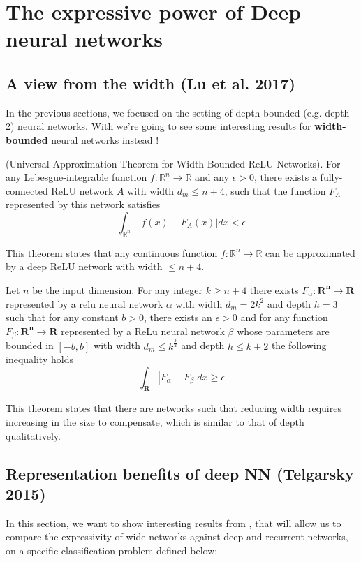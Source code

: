 \documentclass{article}
\begin{document}
\section{The expressive power of Deep neural networks}

\subsection{A view from the width (Lu et al. 2017)}
In the previous sections, we focused on the setting of depth-bounded (e.g. depth-2) neural networks. With \cite{lu2017expressive} we're going to see some interesting results for \textbf{width-bounded} neural networks instead !

\begin{thm}
(Universal Approximation Theorem for Width-Bounded ReLU Networks).
For any Lebesgue-integrable function $f:\mathbb{R}^n \to \mathbb{R}$ and any $\epsilon > 0$, there exists a fully-connected ReLU network $A$ with width $d_m \leq n + 4$, such that the function $F_A$ represented by this network satisfies
$$\int_{\mathbb{R}^n} |f(x)-F_A(x)|dx < \epsilon$$
\end{thm}
This theorem states that any continuous function $f: \mathbb{R}^n \to \mathbb{R}$ can be approximated by a deep ReLU network with width $\leq n+4$.

\begin{thm}
    Let $n$ be the input dimension. For any integer $k \geq n+4$ there exists $F_{\alpha}: \mathbf{R^n} \rightarrow \mathbf{R}$ represented by a relu neural network $\alpha$ with width $d_m= 2k^2$ and depth $h=3$ such that for any constant $b>0$, there exists an $\epsilon>0$ and for any function $F_{\beta}: \mathbf{R^n} \rightarrow \mathbf{R}$ represented by a ReLu neural network $\beta$ whose parameters are bounded in $[-b,b]$ with width $d_m \leq k^{\frac{3}{2}}$ and depth $h \leq k+2$ the following inequality holds
    $$\int_{\mathbf{R}} |F_{\alpha} - F_{\beta}| dx \geq \epsilon$$
\end{thm}

This theorem states that there are networks such that reducing width requires increasing in the size to compensate, which is similar to that of depth qualitatively.

\subsection{Representation benefits of deep NN (Telgarsky 2015)}
In this section, we want to show interesting results from \cite{telgarsky2015representation}, that will allow us to compare the expressivity of wide networks against deep and recurrent networks, on a specific classification problem defined below: \\
\end{document}
